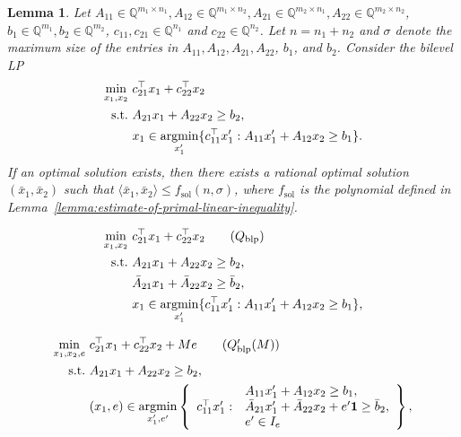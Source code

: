 \documentclass[10pt,a4paper]{amsart}
\newtheorem{lemma}{Lemma}
\DeclareMathOperator*{\Argmin}{\MacroColor{argmin}}
\newcommand{\EncodingSize}{size}
\newcommand{\MacroColor}[1]{#1}
\newcommand{\NConstraints}{\MacroColor{m}}
\newcommand{\NVariables}{\MacroColor{n}}
\newcommand{\OneVector}{\mathbf{1}}
\newcommand{\ReformPen}{\MacroColor{e}}
\newcommand{\SizeTwo}[2]{\langle#1,#2\rangle}
\newcommand{\SolutionSizeEstimate}{\MacroColor{f_{\mathrm{sol}}}}
\begin{document}
\begin{lemma}
\label{lemma:SolutionSizeEstimate}
Let
$A_{1 1} \in \mathbb{Q}^{\NConstraints_1 \times \NVariables_1}, A_{1 2} \in \mathbb{Q}^{\NConstraints_1 \times \NVariables_2}, A_{2 1} \in \mathbb{Q}^{\NConstraints_2 \times \NVariables_1}, A_{2 2} \in \mathbb{Q}^{\NConstraints_2 \times \NVariables_2}$, $b_1 \in \mathbb{Q}^{\NConstraints_1}, b_2 \in \mathbb{Q}^{\NConstraints_2}$, $c_{1 1}, c_{2 1} \in \mathbb{Q}^{\NVariables_1}$ and $c_{2 2} \in \mathbb{Q}^{\NVariables_2}$.
Let $\NVariables = \NVariables_1 + \NVariables_2$ and $\sigma$ denote the maximum \EncodingSize{} of the entries in $A_{1 1}, A_{1 2}, A_{2 1}, A_{2 2}$, $b_1$, and $b_2$.
Consider the bilevel LP
\begin{align}
\min_{x_1, x_2} \ &
c_{2 1}^{\top} x_1 + c_{2 2}^{\top} x_2
\label{eq:SolutionSizeEstimateBLP}
\\
\text{s.t.} \ &
A_{2 1} x_1 + A_{2 2} x_2 \ge b_2, \notag \\
&
x_1 \in \Argmin_{x_1'} \{ c_{1 1}^{\top} x_1' : A_{1 1} x_1' + A_{1 2} x_2 \ge b_1 \}. \notag
\end{align}
If an optimal solution exists, then there exists a rational optimal solution $(\bar{x}_1, \bar{x}_2)$ such that $\SizeTwo{\bar{x}_1}{\bar{x}_2} \le \SolutionSizeEstimate(\NVariables, \sigma)$, \label{Rev:DefOfFSol} where $\SolutionSizeEstimate$ is the polynomial defined in Lemma~\ref{lemma:estimate-of-primal-linear-inequality}.
\end{lemma}

\begin{align}
\min_{x_1, x_2} \ &
c_{2 1}^{\top} x_1 + c_{2 2}^{\top} x_2 
\tag{$Q_{\mathrm{blp}}$}
\label{eq:PenaltyBefore}
\\
\text{s.t.} \ &
A_{2 1} x_1 + A_{2 2} x_2 \ge b_2, \notag \\
&
\bar{A}_{2 1} x_1 + \bar{A}_{2 2} x_2 \ge \bar{b}_2, \notag \\
&
x_1 \in \Argmin_{x_1'} \{ c_{1 1}^{\top} x_1' : A_{1 1} x_1' + A_{1 2} x_2 \ge b_1 \}, \notag 
\end{align}

\begin{align}
\min_{x_1, x_2, \ReformPen} \ &
c_{2 1}^{\top} x_1 + c_{2 2}^{\top} x_2 + M \ReformPen
\tag{$Q_{\mathrm{blp}}'(M)$}
\label{eq:PenaltyAfter}
\\
\text{s.t.} \ &
A_{2 1} x_1 + A_{2 2} x_2 \ge b_2, \notag \\
&
(x_1, \ReformPen) \in \Argmin_{x_1', \ReformPen'} 
\left\{ 
\begin{array}{rl}
&
A_{1 1} x_1' + A_{1 2} x_2 \ge b_1, \\
c_{1 1}^{\top} x_1' : 
&
\bar{A}_{2 1} x_1' + \bar{A}_{2 2} x_2 + \ReformPen' \OneVector \ge \bar{b}_2, \\
&
\ReformPen' \in I_{\ReformPen}
\end{array}
\right\}, \notag 
\end{align}
\end{document}
